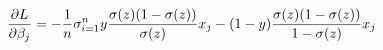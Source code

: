 \documentclass[preview]{standalone}
\begin{document}
\begin{align*}
\special{dvisvgm:raw <g id='unique000'>}\frac{\partial{L}}{\partial\beta_j}=-\frac{1}{n}\sigma^n_{i=1}y\frac{\sigma(z)(1-\sigma(z))}{\sigma(z)}x_j-(1-y)\frac{\sigma(z)(1-\sigma(z))}{1-\sigma(z)}x_j\special{dvisvgm:raw </g>}
\end{align*}
\end{document}
